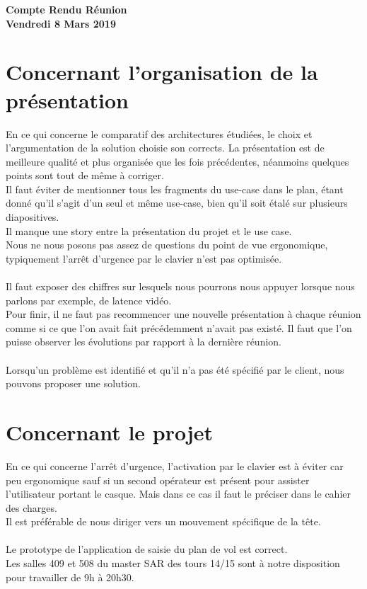 \documentclass[]{article}
\begin{document}
\pagestyle{fancy}
\renewcommand\headrulewidth{1pt}
\renewcommand\footrulewidth{1pt}

\begin{center}
\large{\textbf{Compte Rendu Réunion \\ Vendredi 8 Mars 2019 \bigbreak}}
\end{center}

\section{Concernant l'organisation de la présentation}
En ce qui concerne le comparatif des architectures étudiées, le choix et l'argumentation de la solution choisie son corrects. La présentation est de meilleure qualité et plus organisée que les fois précédentes, néanmoins quelques points sont tout de même à corriger.\\
\indent Il faut éviter de mentionner tous les fragments du use-case dans le plan, étant donné qu'il s'agit d'un seul et même use-case, bien qu'il soit étalé sur plusieurs diapositives.\\
Il manque une story entre la présentation du projet et le use case.\\
\indent Nous ne nous posons pas assez de questions du point de vue ergonomique, typiquement l'arrêt d'urgence par le clavier n'est pas optimisée.\\
\\
\indent Il faut exposer des chiffres sur lesquels nous pourrons nous appuyer lorsque nous parlons par exemple, de latence vidéo.\\
\indent Pour finir, il ne faut pas recommencer une nouvelle présentation à chaque réunion comme si ce que l'on avait fait précédemment n'avait pas existé. Il faut que l'on puisse observer les évolutions par rapport à la dernière réunion. \\
\\
\indent Lorsqu’un problème est identifié et qu'il n'a pas été spécifié par le client, nous pouvons proposer une solution.\\


\section{Concernant le projet}
En ce qui concerne l'arrêt d'urgence, l'activation par le clavier est à éviter car peu ergonomique sauf si un second opérateur est présent pour assister l'utilisateur portant le casque. Mais dans ce cas il faut le préciser dans le cahier des charges.\\
Il est préférable de nous diriger vers un mouvement spécifique de la tête.\\
\\
\indent Le prototype de l'application de saisie du plan de vol est correct.\\
\indent Les salles 409 et 508 du master SAR des tours 14/15 sont à notre disposition pour travailler de 9h à 20h30.\\
\end{document}

